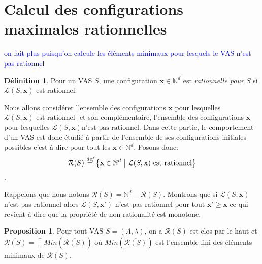 \documentclass[a4paper,final]{article}
\theoremstyle{definition}
\newtheorem{Definition}[Theorem]{Définition}
\newtheorem{Proposition}[Theorem]{Proposition}
\let\geq\geqslant
\newcommand{\alain}[1]{\textcolor{blue}{#1}}
\newcommand{\set}[2]{\left\{#1\mathrel{\left|\vphantom{#1}\vphantom{#2}\right.}#2\right\}}
\newcommand{\defeq}{\ensuremath{\stackrel{\textit{def}}{=}}}
\newcommand{\Min}{\textit{Min}}
\newcommand{\N}{\ensuremath{\mathbb{N}}}
\newcommand{\lang}{\ensuremath{\mathcal{L}}}
\newcommand{\vect}[1]{\ensuremath{\mathbf{#1}}}
\newcommand{\inirat}{\mathcal{R}}
\begin{document}

\section{Calcul des configurations maximales rationnelles}
\alain{on fait plus puisqu'on calcule les éléments minimaux pour lesquels le VAS n'est pas rationnel}

\begin{Definition}
Pour un VAS $S$, une configuration $\vect{x} \in \N^d$ est \emph{rationnelle pour $S$} si $\lang(S,\vect{x})$ est rationnel.
\end{Definition}

Nous allons considérer l'ensemble des configurations $\vect{x}$ pour lesquelles ${\lang(S,\vect{x}) \text{ est rationnel }}$ et son complémentaire, l'ensemble des configurations $\vect{x}$ pour lesquelles ${\lang(S,\vect{x}) \text{n'est pas rationnel}}$. 
%
	Dans cette partie, le comportement d'un VAS est donc étudié à partir de l'ensemble de ses configurations initiales possibles c'est-à-dire pour tout les $\vect{x} \in \N^d$.
%
Posons donc: $$\inirat(S) \defeq \set{\vect{x} \in \N^d} {\lang(S,\vect{x}) \text{ est rationnel}}$$.

%
% 

\noindent
Rappelons que nous notons $\overline{\inirat(S)}
    = \N^d - \inirat(S)$.
%
Montrons que si $\lang(S,\vect{x})$ n'est pas rationnel alors $\lang(S,\vect{x'})$ n'est pas rationnel pour tout $\vect{x'} \geq \vect{x}$ ce qui revient à dire que la propriété de non-rationalité est monotone.

\begin{Proposition}\label{monotonie_rationnel}
Pour tout VAS $S = (A,\lambda)$, on a $\overline{\inirat(S)}$ est clos par le haut et $\overline{\inirat(S)} = \uparrow \Min(\overline{\inirat(S)})$ où $\Min(\overline{\inirat(S)})$ est l'ensemble fini des éléments minimaux de $\overline{\inirat(S)}$.
\end{Proposition}
\end{document}
